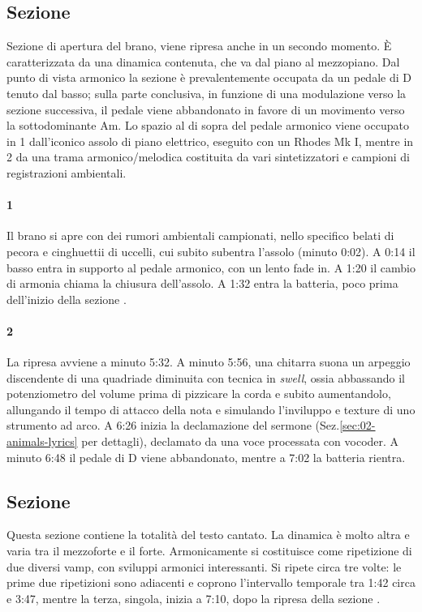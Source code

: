\documentclass[class=book, crop=false, oneside, 12pt]{standalone}
\begin{document}
    \subsection{Sezione }
    Sezione di apertura del brano, viene ripresa anche in un secondo momento. È caratterizzata da una dinamica contenuta, che va dal piano al mezzopiano. Dal punto di vista armonico la sezione è prevalentemente occupata da un pedale di D tenuto dal basso; sulla parte conclusiva, in funzione di una modulazione verso la sezione successiva, il pedale viene abbandonato in favore di un movimento verso la sottodominante Am. Lo spazio al di sopra del pedale armonico viene occupato in 1 dall'iconico assolo di piano elettrico, eseguito con un Rhodes Mk I, mentre in 2 da una trama armonico/melodica costituita da vari sintetizzatori e campioni di registrazioni ambientali.

    \paragraph{1} 
    Il brano si apre con dei rumori ambientali campionati, nello specifico belati di pecora e cinghuettii di uccelli, cui subito  subentra l'assolo (minuto 0:02). A 0:14 il basso entra in supporto al pedale armonico, con un lento fade in. A 1:20 il cambio di armonia chiama la chiusura dell'assolo. A 1:32 entra la batteria, poco prima dell'inizio della sezione .

    \paragraph{2} 
    La ripresa avviene a minuto 5:32. A minuto 5:56,  una chitarra suona un arpeggio discendente di una quadriade diminuita con tecnica in \emph{swell}, ossia abbassando il potenziometro del volume prima di pizzicare la corda e subito aumentandolo, allungando il tempo di attacco della nota e simulando l'inviluppo e texture di uno strumento ad arco. A 6:26 inizia la declamazione del sermone (Sez.\ref{sec:02-animals-lyrics} per dettagli), declamato da una voce processata con vocoder. A minuto 6:48 il pedale di D viene abbandonato, mentre a 7:02 la batteria rientra.

    \subsection{Sezione }
    Questa sezione contiene la totalità del testo cantato. La dinamica è molto altra e varia tra il mezzoforte e il forte. Armonicamente si costituisce come ripetizione di due diversi vamp, con sviluppi armonici interessanti. Si ripete circa tre volte: le prime due ripetizioni sono adiacenti e coprono l'intervallo temporale tra 1:42 circa e 3:47, mentre la terza, singola,  inizia a 7:10, dopo la ripresa della sezione .
\end{document}
